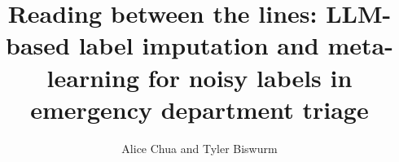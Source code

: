 \documentclass{styles/minimal}
\begin{document}
\title{Reading between the lines: LLM-based label imputation and meta-learning for noisy labels in emergency department triage}

\author{Alice Chua and Tyler Biswurm}


\maketitle










\clearpage


\clearpage
\appendix

\end{document}
